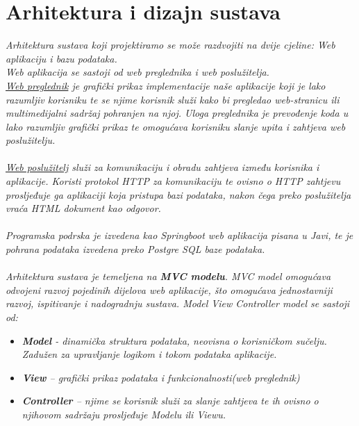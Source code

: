 \chapter{Arhitektura i dizajn sustava}
		
		\textit{Arhitektura sustava koji projektiramo se može razdvojiti na dvije cjeline: Web aplikaciju i bazu podataka.}\\
		
		\textit{Web aplikacija se sastoji od web preglednika i web poslužitelja.}\\
		
		\textit{\underline{Web preglednik} je grafički prikaz implementacije naše aplikacije koji je lako razumljiv korisniku te se njime korisnik služi kako bi pregledao web-stranicu ili multimedijalni sadržaj pohranjen na njoj. Uloga preglednika je prevođenje koda u lako razumljiv grafički prikaz te omogućava korisniku slanje upita i zahtjeva web poslužitelju.}\\
		\\
		\textit{\underline{Web poslužitelj} služi za komunikaciju i obradu zahtjeva između korisnika i aplikacije. Koristi protokol HTTP za komunikaciju te ovisno o HTTP zahtjevu prosljeđuje ga aplikaciji koja pristupa bazi podataka, nakon čega preko poslužitelja vraća HTML dokument kao odgovor.}\\
		\\
		\textit{Programska podrska je izvedena kao Springboot web aplikacija pisana u Javi, te je pohrana podataka izvedena preko Postgre SQL baze podataka.}\\
		\\
		\textit{Arhitektura sustava je temeljena na \textbf{MVC modelu}. MVC model omogućava odvojeni razvoj pojedinih dijelova web aplikacije, što omogućava jednostavniji razvoj, ispitivanje i nadogradnju sustava.
Model View Controller model se sastoji od:
}\\
	\begin{itemize}
		\item 	\textit{\textbf{Model}  - dinamička struktura podataka, neovisna o korisničkom sučelju. Zadužen za upravljanje logikom i tokom podataka aplikacije.}
		\item 	\textit{\textbf{View} – grafički prikaz podataka i funkcionalnosti(web preglednik)}
		\item 	\textit{\textbf{Controller} – njime se korisnik služi za slanje zahtjeva te ih ovisno o njihovom sadržaju prosljeđuje Modelu ili Viewu.}		
	\end{itemize}

